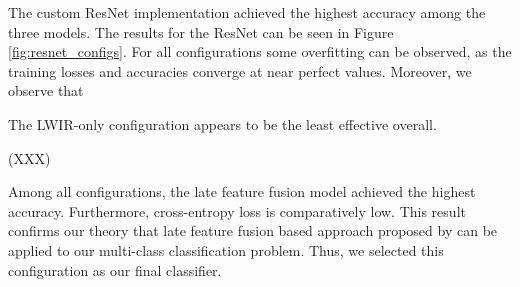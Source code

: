 \documentclass{l4proj}
\begin{document}
The custom ResNet implementation achieved the highest accuracy among the three models. The results for the ResNet can be seen in Figure \ref{fig:resnet_configs}. For all configurations some overfitting can be observed, as the training losses and accuracies converge at near perfect values. Moreover, we observe that 

The LWIR-only configuration appears to be the least effective overall. 

(XXX)

Among all configurations, the late feature fusion model achieved the highest accuracy. Furthermore, cross-entropy loss is comparatively low. This result confirms our theory that late feature fusion based approach proposed by \citet{wagner_multispectral_2016} can be applied to our multi-class classification problem. Thus, we selected this configuration as our final classifier. 





\end{document}
